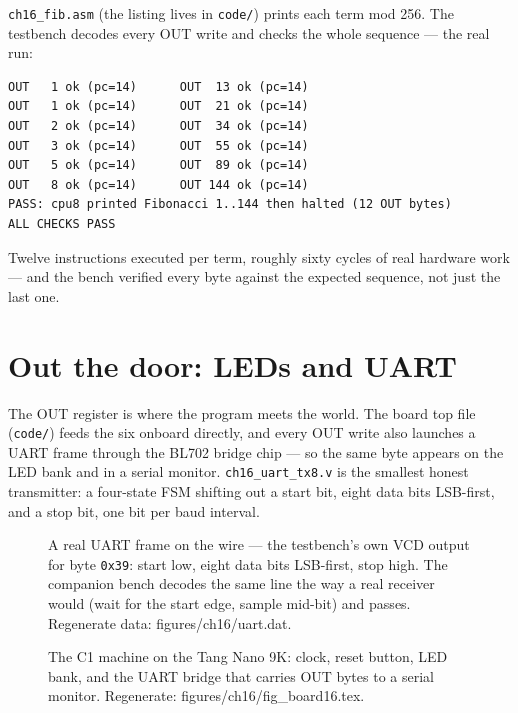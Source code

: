 \begin{example}
\texttt{ch16\_fib.asm} (the listing lives in \texttt{code/}) prints
each term mod 256. The testbench decodes every OUT write and checks
the whole sequence --- the real run:

\begin{lstlisting}[caption={\ttfamily ch16\_cpu8\_tb.v running
\texttt{fib.hex} --- twelve correct OUT bytes, then HALT.}]
OUT   1 ok (pc=14)      OUT  13 ok (pc=14)
OUT   1 ok (pc=14)      OUT  21 ok (pc=14)
OUT   2 ok (pc=14)      OUT  34 ok (pc=14)
OUT   3 ok (pc=14)      OUT  55 ok (pc=14)
OUT   5 ok (pc=14)      OUT  89 ok (pc=14)
OUT   8 ok (pc=14)      OUT 144 ok (pc=14)
PASS: cpu8 printed Fibonacci 1..144 then halted (12 OUT bytes)
ALL CHECKS PASS
\end{lstlisting}

Twelve instructions executed per term, roughly sixty cycles of real
hardware work --- and the bench verified every byte against the
expected sequence, not just the last one.
\end{example}

\section{Out the door: LEDs and UART}\label{sec:out16}

The OUT register is where the program meets the world. The board
top file (\texttt{code/}) feeds the six onboard
directly, and every OUT write also launches a UART frame through the
BL702 bridge chip --- so the same byte appears on the LED bank and in
a serial monitor. \texttt{ch16\_uart\_tx8.v} is the smallest honest
transmitter: a four-state FSM shifting out a start bit, eight data
bits LSB-first, and a stop bit, one bit per baud interval.

\begin{figure}[htbp]
\centering

\caption{A real UART frame on the wire --- the testbench's own VCD
output for byte \texttt{0x39}: start low, eight data bits LSB-first,
stop high. The companion bench decodes the same line the way a real
receiver would (wait for the start edge, sample mid-bit) and passes.
Regenerate data: \ttfamily figures/ch16/uart.dat.}
\label{fig:uart16}
\end{figure}

\begin{figure}[htbp]
\centering

\caption{The C1 machine on the Tang Nano 9K: clock, reset button, LED
bank, and the UART bridge that carries OUT bytes to a serial monitor.
Regenerate: \ttfamily figures/ch16/fig\_board16.tex.}
\label{fig:board16}
\end{figure}

